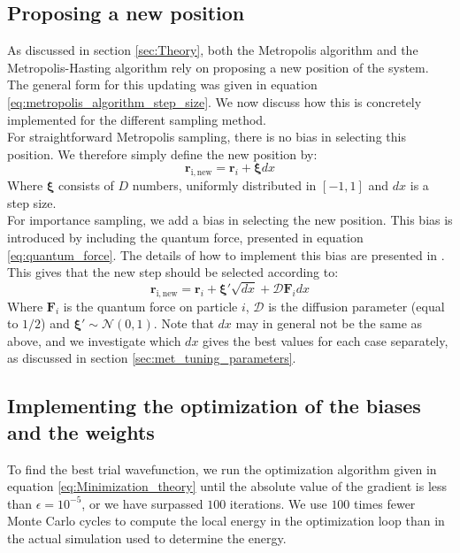 \documentclass[a4paper, 10pt]{article}
\begin{document}
	\subsection{Proposing a new position}\label{sec:met_propose_new_position}
	As discussed in section \ref{sec:Theory}, both the Metropolis algorithm and the Metropolis-Hasting algorithm rely on proposing a new position of the system. The general form for this updating was given in equation \ref{eq:metropolis_algorithm_step_size}. We now discuss how this is concretely implemented for the different sampling method.\\
	\linebreak
	For straightforward Metropolis sampling, there is no bias in selecting this position. We therefore simply define the new position by:
	\begin{equation}
	\boldsymbol{r}_{\mathrm{i,new}}=\boldsymbol{r}_i+\boldsymbol{\xi}dx
	\end{equation}
	Where $\boldsymbol{\xi}$ consists of $D$ numbers, uniformly distributed in $[-1,1]$ and $dx$ is a step size.\\
	\linebreak
	For importance sampling, we add a bias in selecting the new position. This bias is introduced by including the quantum force, presented in equation \ref{eq:quantum_force}. The details of how to implement this bias are presented in \cite{Hjorth-Jensen2015}. This gives that the new step should be selected according to:
	\begin{equation}
	\boldsymbol{r}_{\mathrm{i,new}}=\boldsymbol{r}_i+\boldsymbol{\xi'}\sqrt{dx}+\mathcal{D}\boldsymbol{F}_i dx
	\end{equation}
	Where $\boldsymbol{F}_i$ is the quantum force on particle $i$, $\mathcal{D}$ is the diffusion parameter (equal to $1/2$) and $\boldsymbol{\xi'}\sim \mathcal{N}(0,1)$. Note that $dx$ may in general not be the same as above, and we investigate which $dx$ gives the best values for each case separately, as discussed in section \ref{sec:met_tuning_parameters}.
	\subsection{Implementing the optimization of the biases and the weights}
	To find the best trial wavefunction, we run the optimization algorithm given in equation \ref{eq:Minimization_theory} until the absolute value of the gradient is less than $\epsilon=10^{-5}$, or we have surpassed $100$ iterations. We use $100$ times fewer Monte Carlo cycles to compute the local energy in the optimization loop than in the actual simulation used to determine the energy.
\end{document}
